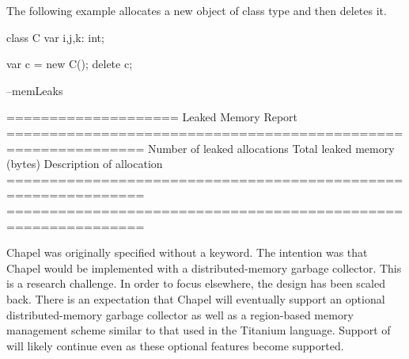 \begin{example}
The following example allocates a new object  of class type 
and then deletes it.
\begin{chapelpre}
class C {
  var i,j,k: int;
}
\end{chapelpre}
\begin{chapel}
var c = new C();
delete c;
\end{chapel}
\begin{chapelpost}
\end{chapelpost}
\begin{chapelexecopts}
--memLeaks
\end{chapelexecopts}
\begin{chapeloutput}

====================
Leaked Memory Report
==============================================================
Number of leaked allocations
           Total leaked memory (bytes)
                      Description of allocation
==============================================================
==============================================================
\end{chapeloutput}
\end{example}

\begin{openissue}
Chapel was originally specified without a  keyword.  The intention
was that Chapel would be implemented with a distributed-memory garbage
collector.  This is a research challenge.  In order to focus elsewhere, the
design has been scaled back.  There is an expectation that Chapel will
eventually support an optional distributed-memory garbage collector as well as
a region-based memory management scheme similar to that used in the Titanium
language.  Support of  will likely continue even as these optional
features become supported.
\end{openissue}
